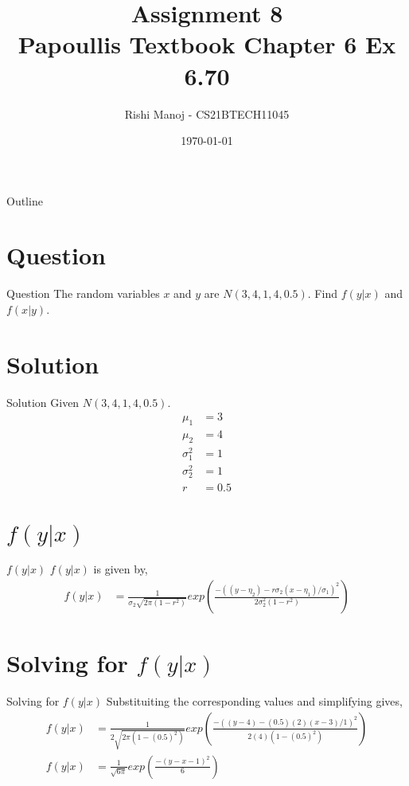 \documentclass{beamer}
\title{Assignment 8 \\ Papoullis Textbook Chapter 6 Ex 6.70}
\author{Rishi Manoj - CS21BTECH11045}
\date{\today}
\providecommand{\brak}[1]{\ensuremath{\left(#1\right)}}
\begin{document}
\begin{frame}
    \titlepage 
\end{frame}

\logo{}


\begin{frame}{Outline}
    \tableofcontents
\end{frame}


\section{Question}
\begin{frame}{Question}
The random variables $x$ and $y$ are $N(3,4,1,4,0.5)$. Find $f(y|x)$ and $f(x|y)$.
\end{frame}


\section{Solution}
\begin{frame}{Solution}
Given $N(3,4,1,4,0.5)$.
	\begin{align}
	       \mu_1 &= 3 \\
	       \mu_2 &= 4 \\
	       \sigma_1^2 &= 1 \\ 
	       \sigma_2^2 &= 1 \\ 	       
	       r &= 0.5
	\end{align}
\end{frame}


\section{$f(y|x)$}
\begin{frame}{$f(y|x)$}
$f(y|x)$ is given by,
	\begin{align}
	        f(y|x) &= \frac{1}{\sigma _2\sqrt{2\pi(1-r^2)}}exp\brak{\frac{-((y-\eta_2)-r\sigma_2(x-\eta_1)/\sigma_1)^2}{2\sigma_2^2(1-r^2)}}
	\end{align}
\end{frame}



\section{Solving for $f(y|x)$}
\begin{frame}{Solving for $f(y|x)$}
Substituiting the corresponding values and simplifying gives,
	\begin{align}
	        f(y|x) &= \frac{1}{2\sqrt{2\pi(1-(0.5)^2)}}exp\brak{\frac{-((y-4)-(0.5)(2)(x-3)/1)^2}{2(4)(1-(0.5)^2)}} \\
	        f(y|x) &= \frac{1}{\sqrt{6\pi}}exp\brak{\frac{-(y-x-1)^2}{6}}
	\end{align}
\end{frame}
\end{document}

